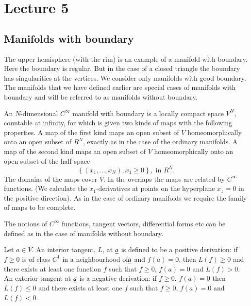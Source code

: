 \chapter{Lecture 5}

\section*{Manifolds with boundary}\pageoriginale

The upper hemisphere (with the rim) is an example of a manifold with
boundary. Here the boundary is regular. But in the case of a closed
triangle the boundary has singularities at the vertices. We consider
only manifolds with good boundary. The manifolds that we have defined
earlier are special cases of manifolds with boundary and will be
referred to as manifolds without boundary.

An $N$-dimensional $C^{\infty}$ manifold with boundary is a locally
compact space $V^{N}$, countable at infinity, for which is given two
kinds of maps with the following properties. A map of the first kind
maps an open subset of $V$ homeomorphically onto an open subset of
$R^{N}$, exactly as in the case of the ordinary manifolds. A map of
the second kind maps an open subset of $V$ homeomorphically onto an
open subset of the half-space
$$
\left\{(x_{1},\ldots,x_{N}),x_{1}\geq 0\right\},\text{ in } R^{N}.
$$
The domains of the maps cover $V$. In the overlaps the maps are
related by $C^{\infty}$ functions. (We calculate the
$x_{1}$-derivatives at points on the hyperplane $x_{1}=0$ in the
positive direction). As in the case of ordinary manifolds we require
the family of maps to be complete.

The notions of $C^{\infty}$ functions, tangent vectors, differential
forms etc.\@ can be defined as in the case of manifolds without
boundary. 

Let $a\in V$. An interior tangent, $L$, at $\underline{a}$ is defined to be a
positive derivation: if $f\geq 0$ is of class $C^{1}$ in a
neighbourhood of\pageoriginale $\underline{a}$ and $f(a)=0$, then $L(f)\geq
0$ and there exists at least one function $f$ such that $f\geq 0$,
$f(a)=0$ and $L(f)>0$. An exterior tangent at $\underline{a}$ is a negative
derivation: if $f\geq 0$, $f(a)=0$ then $L(f)\leq 0$ and there exists
at least one $f$ such that $f\geq 0$, $f(a)=0$ and $L(f) < 0$.

